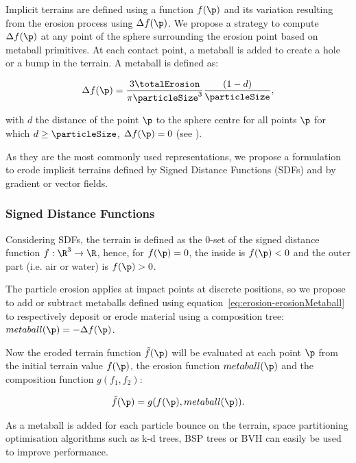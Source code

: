 Implicit terrains are defined using a function $f(\p)$ and its variation resulting from the erosion process using $\Delta f(\p)$.  
We propose a strategy to compute $\Delta f(\p)$ at any point of the sphere surrounding the erosion point based on metaball primitives. At each contact point, a metaball is added to create a hole or a bump in the terrain. A metaball is defined as:

\begin{align}
    \label{eq:erosion-erosionMetaball}
    \Delta f(\p) = \frac{3 \totalErosion}{\pi \particleSize^3} \frac{(1 - d)}{\particleSize},
\end{align}

with $d$ the distance of the point $\p$ to the sphere centre for all points $\p$ for which $d \geq \particleSize$, $\Delta f(\p) = 0$ (see ).

As they are the most commonly used representations, we propose a formulation to erode implicit terrains defined by Signed Distance Functions (SDFs) and by gradient or vector fields.

\subsubsection{Signed Distance Functions}
\label{sec:erosion-application_on_sdf}

Considering SDFs, the terrain is defined as the 0-set of the signed distance function $f: \R^3 \to \R$, hence, for $f(\p) = 0$, the inside is $f(\p) < 0$ and the outer part (i.e. air or water) is $f(\p) > 0$. 

The particle erosion applies at impact points at discrete positions, so we propose to add or subtract metaballs defined using equation~\eqref{eq:erosion-erosionMetaball} to respectively deposit or erode material using a composition tree:
 $metaball(\p) = -\Delta f(\p)$.

Now the eroded terrain function $\Tilde{f}(\p)$ will be evaluated at each point $\p$ from the initial terrain value $f(\p)$, the erosion function $metaball(\p)$ and the composition function $g(f_1, f_2)$:

\begin{align}
    \Tilde{f}(\p) = g(f(\p), metaball(\p)). \nonumber
\end{align}

As a metaball is added for each particle bounce on the terrain, space partitioning optimisation algorithms such as k-d trees, BSP trees or BVH can easily be used to improve performance.


